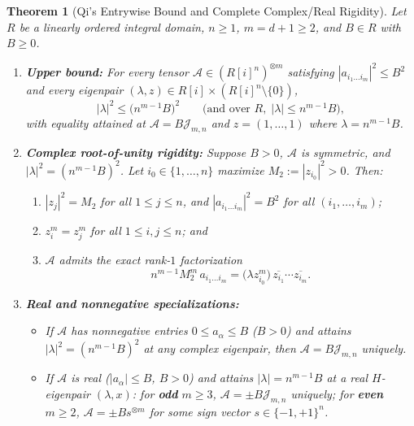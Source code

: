 \documentclass[11pt]{article}
\newtheorem{theorem}{Theorem}[section]
\theoremstyle{definition}
\newcommand{\cA}{\mathcal{A}}
\newcommand{\cJ}{\mathcal{J}}
\begin{document}
\begin{theorem}[Qi's Entrywise Bound and Complete Complex/Real Rigidity]\label{thm:entry-rigidity}
Let $R$ be a linearly ordered integral domain, $n \ge 1$, $m = d + 1 \ge 2$, and $B \in R$
with $B \ge 0$.
\begin{enumerate}
  \item \textbf{Upper bound:} For every tensor $\cA \in (R[i]^n)^{\otimes m}$ satisfying
  $|a_{i_1 \dots i_m}|^2 \le B^2$ and every eigenpair $(\lambda, z) \in R[i] \times (R[i]^n \setminus \{0\})$,
  \[
    |\lambda|^2 \le \bigl(n^{m-1} B\bigr)^2
    \qquad \bigl(\text{and over } R,\; |\lambda| \le n^{m-1} B\bigr),
  \]
  with equality attained at $\cA = B \cJ_{m,n}$ and $z = (1, \dots, 1)$ where $\lambda = n^{m-1} B$.
  \item \textbf{Complex root-of-unity rigidity:} Suppose $B > 0$, $\cA$ is symmetric, and
  $|\lambda|^2 = (n^{m-1} B)^2$. Let $i_0 \in \{1, \dots, n\}$ maximize $M_2 := |z_{i_0}|^2 > 0$.
  Then:
  \begin{enumerate}
    \item $|z_j|^2 = M_2$ for all $1 \le j \le n$, and $|a_{i_1 \dots i_m}|^2 = B^2$ for all
    $(i_1, \dots, i_m)$;
    \item $z_i^m = z_j^m$ for all $1 \le i, j \le n$; and
    \item $\cA$ admits the exact rank-$1$ factorization
    \[
      n^{m-1} M_2^m \, a_{i_1 \dots i_m}
      = \bigl(\lambda z_{i_0}^m\bigr)\, \overline{z_{i_1}} \cdots \overline{z_{i_m}}.
    \]
  \end{enumerate}
  \item \textbf{Real and nonnegative specializations:}
  \begin{itemize}
    \item If $\cA$ has nonnegative entries $0 \le a_\alpha \le B$ ($B > 0$) and attains
    $|\lambda|^2 = (n^{m-1} B)^2$ at any complex eigenpair, then $\cA = B \cJ_{m,n}$ uniquely.
    \item If $\cA$ is real ($|a_\alpha| \le B$, $B > 0$) and attains $|\lambda| = n^{m-1} B$
    at a real $H$-eigenpair $(\lambda, x)$: for \textbf{odd} $m \ge 3$, $\cA = \pm B \cJ_{m,n}$
    uniquely; for \textbf{even} $m \ge 2$, $\cA = \pm B s^{\otimes m}$ for some sign vector
    $s \in \{-1, +1\}^n$.
  \end{itemize}
\end{enumerate}
\end{theorem}
\end{document}

